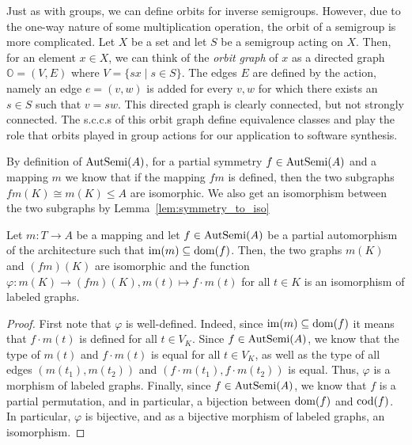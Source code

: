 Just as with groups, we can define orbits for inverse semigroups.
However, due to the one-way nature of some multiplication operation, the orbit of a semigroup is more complicated.
Let $X$ be a set and let $S$ be a semigroup acting on $X$.
Then, for an element $x \in X$, we can think of the \emph{orbit graph} of $x$ as a directed graph $\mathbb{O} = (V,E)$ where $V = \{ s x \mid s \in S \}$.
The edges $E$ are defined by the action, namely an edge $e = (v,w)$ is added for every $v,w$ for which there exists an $s \in S$ such that $v = s w$.
This directed graph is clearly connected, but not strongly connected.
The \acp{s.c.c.} of this orbit graph define equivalence classes and play the role that orbits played in group actions for our application to software synthesis.

By definition of $\operatorname{AutSemi}(A)$, for a partial symmetry $f \in \operatorname{AutSemi}(A)$ and a mapping $m$ we know that if the mapping $fm$ is defined, then the two subgraphs $fm(K) \cong m(K) \leq A$ are isomorphic.
We also get an isomorphism between the two subgraphs by Lemma~\ref{lem:symmetry_to_iso}
\begin{lem}
\label{lem:symmetry_to_iso}
Let $m : T \rightarrow A$ be a mapping and let $f \in \operatorname{AutSemi}(A)$ be a partial automorphism of the architecture such that $\operatorname{im}(m) \subseteq \operatorname{dom}(f)$.
Then, the two graphs $m(K)$ and $(fm)(K)$ are isomorphic and the function $\varphi: m(K) \rightarrow (fm)(K), m(t) \mapsto f \cdot m(t)$ for all $t \in K$ is an isomorphism of labeled graphs.
\begin{proof}
First note that $\varphi$ is well-defined.
Indeed, since $\operatorname{im}(m) \subseteq \operatorname{dom}(f)$ it means that $f \cdot m(t)$ is defined for all $t \in V_K$.
Since $f \in \operatorname{AutSemi}(A)$, we know that the type of $m(t)$ and $f \cdot m(t)$ is equal for all $t \in V_K$, as well as the type of all edges $(m(t_1),m(t_2))$ and $(f \cdot m(t_1), f \cdot m(t_2))$ is equal.
Thus, $\varphi$ is a morphism of labeled graphs.
Finally, since $f \in \operatorname{AutSemi}(A)$, we know that $f$ is a partial permutation, and in particular, a bijection between $\operatorname{dom}(f)$ and $\operatorname{cod}(f)$.
In particular, $\varphi$ is bijective, and as a bijective morphism of labeled graphs, an isomorphism. 
\end{proof}
\end{lem}

